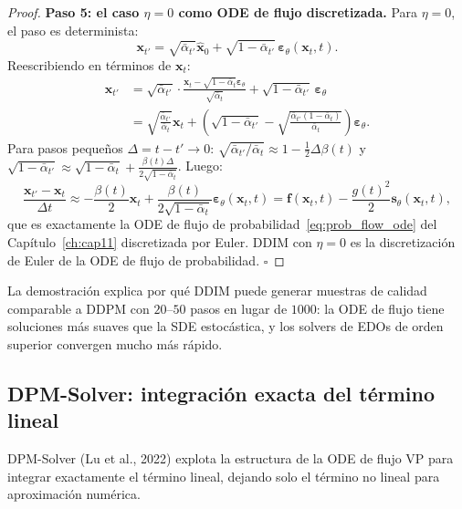 \begin{proof}
\textbf{Paso 5: el caso $\eta=0$ como ODE de flujo discretizada.}
Para $\eta=0$, el paso es determinista:
\[
  \bm{x}_{t'} = \sqrt{\bar{\alpha}_{t'}}\hat{\bm{x}}_0
  + \sqrt{1-\bar{\alpha}_{t'}}\,\bm{\varepsilon}_\theta(\bm{x}_t,t).
\]
Reescribiendo en términos de $\bm{x}_t$:
\begin{align*}
  \bm{x}_{t'}
  &= \sqrt{\bar{\alpha}_{t'}}\cdot\frac{\bm{x}_t - \sqrt{1-\bar{\alpha}_t}
    \bm{\varepsilon}_\theta}{\sqrt{\bar{\alpha}_t}}
    + \sqrt{1-\bar{\alpha}_{t'}}\,\bm{\varepsilon}_\theta \\
  &= \sqrt{\frac{\bar{\alpha}_{t'}}{\bar{\alpha}_t}}\bm{x}_t
    + \left(\sqrt{1-\bar{\alpha}_{t'}}
    - \sqrt{\frac{\bar{\alpha}_{t'}(1-\bar{\alpha}_t)}{\bar{\alpha}_t}}\right)
    \bm{\varepsilon}_\theta.
\end{align*}
Para pasos pequeños $\Delta = t - t' \to 0$:
$\sqrt{\bar{\alpha}_{t'}/\bar{\alpha}_t} \approx 1 - \frac{1}{2}\Delta\beta(t)$ y
$\sqrt{1-\bar{\alpha}_{t'}} \approx \sqrt{1-\bar{\alpha}_t} +
\frac{\beta(t)\Delta}{2\sqrt{1-\bar{\alpha}_t}}$.
Luego:
\[
  \frac{\bm{x}_{t'} - \bm{x}_t}{\Delta t}
  \approx -\frac{\beta(t)}{2}\bm{x}_t
  + \frac{\beta(t)}{2\sqrt{1-\bar{\alpha}_t}}\bm{\varepsilon}_\theta(\bm{x}_t,t)
  = \bm{f}(\bm{x}_t,t) - \frac{g(t)^2}{2}\bm{s}_\theta(\bm{x}_t,t),
\]
que es exactamente la ODE de flujo de probabilidad~\eqref{eq:prob_flow_ode} del
Capítulo~\ref{ch:cap11} discretizada por Euler. DDIM con $\eta=0$ es la discretización de
Euler de la ODE de flujo de probabilidad. $\square$
\end{proof}

La demostración explica por qué DDIM puede generar muestras de calidad comparable
a DDPM con $20$--$50$ pasos en lugar de $1000$: la ODE de flujo tiene soluciones
más suaves que la SDE estocástica, y los solvers de EDOs de orden superior
convergen mucho más rápido.

\subsection{DPM-Solver: integración exacta del término lineal}
\label{subsec:dpm_solver}

DPM-Solver (Lu et al., 2022) explota la estructura de la ODE de flujo VP para
integrar exactamente el término lineal, dejando solo el término no lineal para
aproximación numérica.

